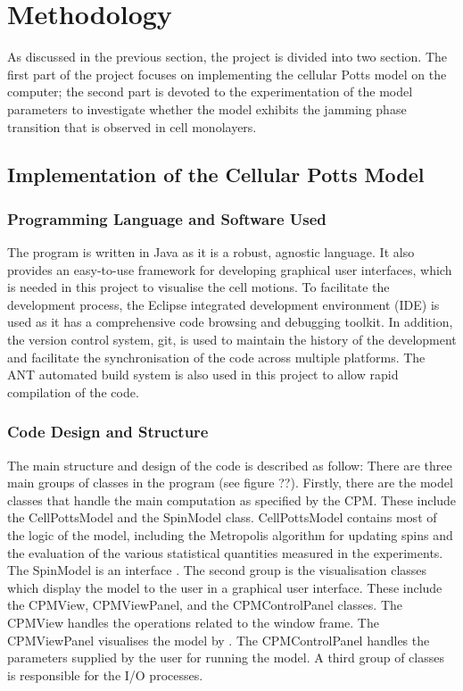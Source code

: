 \documentclass[a4paper,12pt]{article}
\begin{document}
\section{Methodology}
As discussed in the previous section, the project is divided into two section. The first part of the project focuses on implementing the cellular Potts model on the computer; the second part is devoted to the experimentation of the model parameters to investigate whether the model exhibits the jamming phase transition that is observed in cell monolayers.

\subsection{Implementation of the Cellular Potts Model}
\subsubsection{Programming Language and Software Used}
The program is written in Java as it is a robust, agnostic language. It also provides an easy-to-use framework for developing graphical user interfaces, which is needed in this project to visualise the cell motions. To facilitate the development process, the Eclipse integrated development environment (IDE) is used as it has a comprehensive code browsing and debugging toolkit. In addition, the version control system, git, is used to maintain the history of the development and facilitate the synchronisation of the code across multiple platforms. The ANT automated build system is also used in this project to allow rapid compilation of the code.

\subsubsection{Code Design and Structure}
The main structure and design of the code is described as follow: There are three main groups of classes in the program (see figure ??). Firstly, there are the model classes that handle the main computation as specified by the CPM. These include the CellPottsModel and the SpinModel class. CellPottsModel contains most of the logic of the model, including the Metropolis algorithm for updating spins and the evaluation of the various statistical quantities measured in the experiments. The SpinModel is an interface  . The second group is the visualisation classes which display the model to the user in a graphical user interface. These include the CPMView, CPMViewPanel, and the CPMControlPanel classes. The CPMView handles the operations related to the window frame. The CPMViewPanel visualises the model by . The CPMControlPanel handles the parameters supplied by the user for running the model.  A third group of classes is responsible for the I/O processes. 
\end{document}
